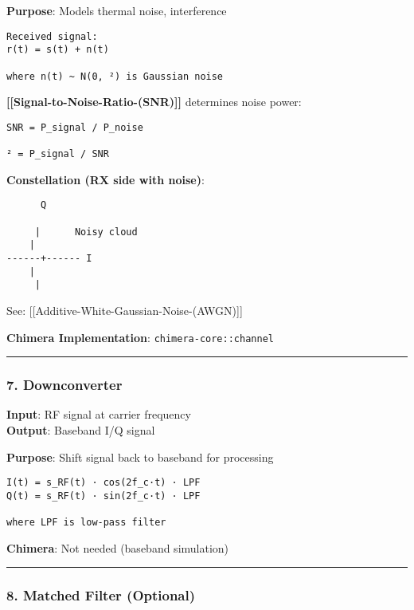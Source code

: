\textbf{Purpose}: Models thermal noise, interference

\begin{verbatim}
Received signal:
r(t) = s(t) + n(t)

where n(t) ~ N(0, ²) is Gaussian noise
\end{verbatim}

\textbf{{[}{[}Signal-to-Noise-Ratio-(SNR){]}{]}} determines noise power:

\begin{verbatim}
SNR = P_signal / P_noise

² = P_signal / SNR
\end{verbatim}

\textbf{Constellation (RX side with noise)}:

\begin{verbatim}
      Q
      
     |      Noisy cloud
    |  
------+------ I
    |  
     |  
\end{verbatim}

See: {[}{[}Additive-White-Gaussian-Noise-(AWGN){]}{]}

\textbf{Chimera Implementation}: \texttt{chimera-core::channel}

\begin{center}\rule{0.5\linewidth}{0.5pt}\end{center}

\subsubsection{7. Downconverter}\label{downconverter}

\textbf{Input}: RF signal at carrier frequency\\
\textbf{Output}: Baseband I/Q signal

\textbf{Purpose}: Shift signal back to baseband for processing

\begin{verbatim}
I(t) = s_RF(t) · cos(2f_c·t) · LPF
Q(t) = s_RF(t) · sin(2f_c·t) · LPF

where LPF is low-pass filter
\end{verbatim}

\textbf{Chimera}: Not needed (baseband simulation)

\begin{center}\rule{0.5\linewidth}{0.5pt}\end{center}

\subsubsection{8. Matched Filter
(Optional)}\label{matched-filter-optional}

